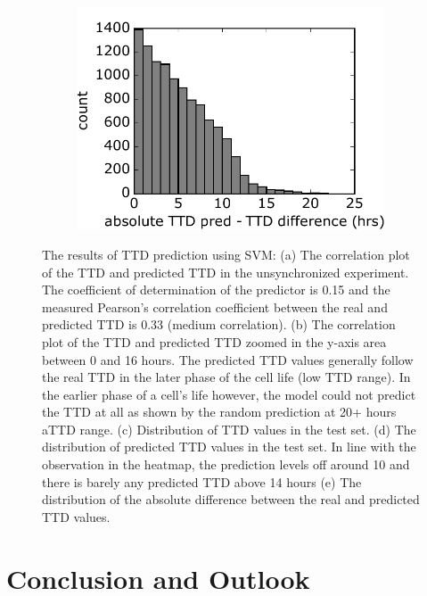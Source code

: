 \documentclass[pdftex,12pt,a4paper]{report}
\begin{document}
\begin{figure}[H]
\begin{subfigure}{.45\textwidth}
  \centering
  \includegraphics[width=\textwidth]{images/svm/pred_ttd_absdiff.pdf}
  \caption{}
  \label{fig:pred_ttd_absdiff}
\end{subfigure}

\caption[SVM results]{The results of TTD prediction using SVM: (a) The correlation plot of the TTD and predicted TTD in the unsynchronized experiment. The coefficient of determination of the predictor is 0.15 and the measured Pearson's correlation coefficient between the real and predicted TTD is 0.33 (medium correlation). (b) The correlation plot of the TTD and predicted TTD zoomed in the y-axis area between 0 and 16 hours. The predicted TTD values generally follow the real TTD in the later phase of the cell life (low TTD range). In the earlier phase of a cell's life however, the model could not predict the TTD at all as shown by the random prediction at 20+ hours aTTD range. (c) Distribution of TTD values in the test set. (d) The distribution of predicted TTD values in the test set. In line with the observation in the heatmap, the prediction levels off around 10 and there is barely any predicted TTD above 14 hours (e) The distribution of the absolute difference between the real and predicted TTD values.}
\label{fig:svm_all}
\end{figure}

\chapter{Conclusion and Outlook}
\label{chapter:conclusion_and_outlook}
\end{document}
